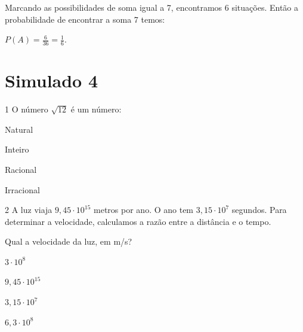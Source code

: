 {{{\begin{escolha}
{{{{\begin{escolha}
\begin{escolha}
{\begin{escolha}
\begin{escolha}
\begin{escolha}
\begin{escolha}
\begin{escolha}
\begin{escolha}
{{Marcando as possibilidades de soma igual a 7, encontramos 6 situações.
Então a probabilidade de encontrar a soma 7 temos:

$P(A) = \frac{6}{36} = \frac{1}{6}$.}

\chapter{Simulado 4}

\num{1} O número $\sqrt{12}$ é um número:

\begin{escolha}

  \item Natural
  
  \item Inteiro
  
  \item Racional
  
  \item Irracional

\end{escolha}


\num{2} A luz viaja $9,45 \cdot 10^15$ metros por ano. O ano tem 
$3,15 \cdot 10^7$ segundos. Para determinar a velocidade, calculamos a 
razão entre a distância e o tempo.

Qual a velocidade da luz, em m/s?

\begin{escolha}

  \item $3 \cdot 10^{8}$
  
  \item $9,45 \cdot 10^{15}$
  
  \item $3,15 \cdot 10^{7}$
  
  \item $6,3 \cdot 10^{8}$


\end{escolha}}
\end{escolha}
\end{escolha}
\end{escolha}
\end{escolha}
\end{escolha}
\end{escolha}}
\end{escolha}
\end{escolha}}}}}
\end{escolha}}}}
